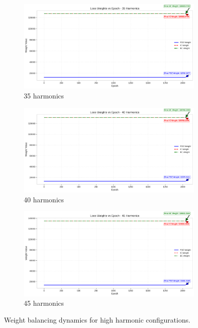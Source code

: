 \begin{figure}[H]
    \centering
    \begin{subfigure}[b]{0.32\textwidth}
        \centering
        \includegraphics[width=\textwidth]{figures/weight_factors_35h.png}
        \caption{35 harmonics}
    \end{subfigure}
    \hfill
    \begin{subfigure}[b]{0.32\textwidth}
        \centering
        \includegraphics[width=\textwidth]{figures/weight_factors_40h.png}
        \caption{40 harmonics}
    \end{subfigure}
    \hfill
    \begin{subfigure}[b]{0.32\textwidth}
        \centering
        \includegraphics[width=\textwidth]{figures/weight_factors_45h.png}
        \caption{45 harmonics}
    \end{subfigure}
    \caption{Weight balancing dynamics for high harmonic configurations.}
    \label{fig:weights_high}
\end{figure}

